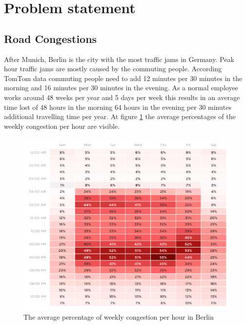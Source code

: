 \section{Problem statement} \label{sec:problems}
\subsection{Road Congestions}
After Munich, Berlin is the city with the most traffic jams in Germany. Peak hour traffic jams are mostly caused by the commuting people. According TomTom \cite{tomtom} data commuting people need to add 12 minutes per 30 minutes in the morning and 16 minutes per 30 minutes in the evening. As a normal employee works around 48 weeks per year and 5 days per week this results in an average time lost of 48 hours in the morning 64 hours in the evening per 30 minutes additional travelling time per year. At figure \ref{averageCongestion} the average percentages of the weekly congestion per hour are visible.

\begin{figure}[h!]
	\centering
	\includegraphics[width=0.55\textheight]{ProblemsFigures/TOMTOMWeeklyAverageCongestion}
	\caption{The average percentage of weekly congestion per hour in Berlin }
	\label{averageCongestion}
\end{figure}

